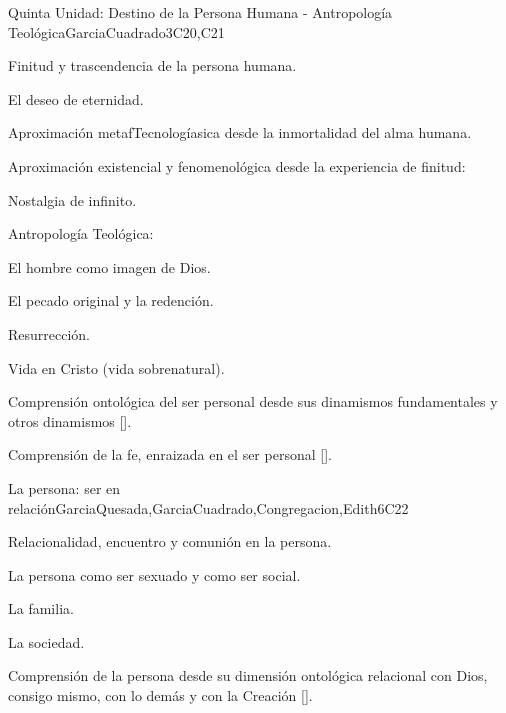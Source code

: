 \begin{syllabus}
\begin{unit}{}{Quinta Unidad: Destino de la Persona Humana - Antropología Teológica}{GarciaCuadrado}{3}{C20,C21}
\begin{topics}
 	 \item Finitud y trascendencia de la persona humana.
 	 \item El deseo de eternidad.
 	 \item Aproximación metafTecnologíasica desde la inmortalidad del alma humana.
 	 \item Aproximación existencial y fenomenológica desde la experiencia de finitud:
		\begin{subtopics}
			\item Nostalgia de infinito.
		\end{subtopics}	
 	 \item Antropología Teológica:
 	 	\begin{subtopics}
			\item El hombre como imagen de Dios.
			\item El pecado original y la redención.
			\item Resurrección.	
			\item Vida en Cristo (vida sobrenatural). 
		\end{subtopics}
\end{topics}
\begin{learningoutcomes}
	\item Comprensión ontológica del ser personal desde sus dinamismos fundamentales y otros dinamismos [\Usage].
	\item Comprensión de la fe, enraizada en el ser personal [\Usage].
\end{learningoutcomes}
\end{unit}

\begin{unit}{}{La persona: ser en relación}{GarciaQuesada,GarciaCuadrado,Congregacion,Edith}{6}{C22}
\begin{topics}
 	 \item Relacionalidad, encuentro y comunión en la persona.
 	 \item La persona como ser sexuado y como ser social.
 	 \item La familia.
 	 \item La sociedad.
\end{topics}
\begin{learningoutcomes}
	\item Comprensión de la persona desde su dimensión ontológica relacional con Dios, consigo mismo, con lo demás y con la Creación [\Usage].
\end{learningoutcomes}
\end{unit}



\begin{coursebibliography}
\end{coursebibliography}

\end{syllabus}
